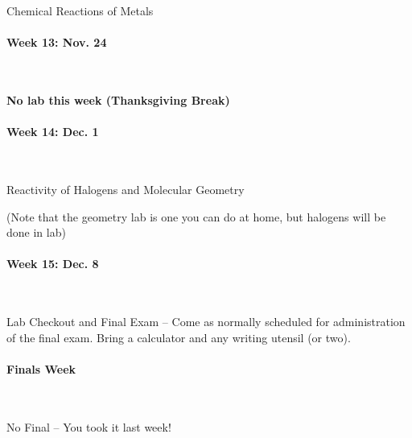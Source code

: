 \documentclass[12pt, letterpaper]{article}
\begin{document}
Chemical Reactions of Metals

\paragraph{Week 13: Nov. 24}~

\textbf{No lab this week (Thanksgiving Break)}

\paragraph{Week 14: Dec. 1}~

Reactivity of Halogens and Molecular Geometry

(Note that the geometry lab is one you can do at home, but halogens will be done in lab)

\paragraph{Week 15: Dec. 8}~

Lab Checkout and Final Exam -- Come as normally scheduled for administration of the final exam. Bring a calculator and any writing utensil (or two).

\paragraph{Finals Week}~

No Final -- You took it last week!
\end{document}
